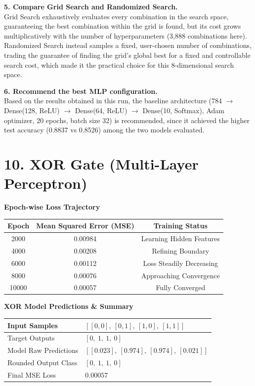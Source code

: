 \documentclass[11pt]{article}
\begin{document}
\textbf{5. Compare Grid Search and Randomized Search.}\\
Grid Search exhaustively evaluates every combination in the search space, guaranteeing the best combination within the grid is found, but its cost grows multiplicatively with the number of hyperparameters (3,888 combinations here). Randomized Search instead samples a fixed, user-chosen number of combinations, trading the guarantee of finding the grid's global best for a fixed and controllable search cost, which made it the practical choice for this 8-dimensional search space.

\textbf{6. Recommend the best MLP configuration.}\\
Based on the results obtained in this run, the baseline architecture (784 $\rightarrow$ Dense(128, ReLU) $\rightarrow$ Dense(64, ReLU) $\rightarrow$ Dense(10, Softmax), Adam optimizer, 20 epochs, batch size 32) is recommended, since it achieved the higher test accuracy (0.8837 vs 0.8526) among the two models evaluated.


\section*{10. XOR Gate (Multi-Layer Perceptron)}

\textbf{Epoch-wise Loss Trajectory}

\begin{center}
\begin{tabular}{|c|c|c|}
\hline
Epoch & Mean Squared Error (MSE) & Training Status\\
\hline
2000 & 0.00984 & Learning Hidden Features\\
\hline
4000 & 0.00208 & Refining Boundary\\
\hline
6000 & 0.00112 & Loss Steadily Decreasing\\
\hline
8000 & 0.00076 & Approaching Convergence\\
\hline
10000 & 0.00057 & Fully Converged\\
\hline
\end{tabular}
\end{center}

\vspace{3mm}

\textbf{XOR Model Predictions \& Summary}

\begin{center}
\begin{tabular}{|p{6cm}|p{7cm}|}
\hline
Input Samples & $[[0,0],\ [0,1],\ [1,0],\ [1,1]]$\\
\hline
Target Outputs & $[0,\ 1,\ 1,\ 0]$\\
\hline
Model Raw Predictions & $[[0.023],\ [0.974],\ [0.974],\ [0.021]]$\\
\hline
Rounded Output Class & $[0,\ 1,\ 1,\ 0]$\\
\hline
Final MSE Loss & $0.00057$\\
\hline
\end{tabular}
\end{center}
\end{document}
